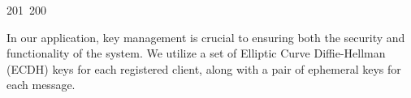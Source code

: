 201~200~\documentclass{article}
\begin{document}
\begin{figure}[ht]
	                                                                                                                                                                                                                                                                                                	                                                                                                                                        	    	                                                                                                	                                                                                                                                                                                                                                                \label{fig:enter-label}
	                                                                                                                                                                                                                                                                                                	                                                                                                                                        	    	                                                                                                	                                                                                                                                                                                                                                                \end{figure}

	                                                                                                                                                                                                                                                                                                	                                                                                                                                        	    	                                                                                                	                                                                                                                                                                                                                                                In our application, key management is crucial to ensuring both the security and functionality of the system. We utilize a set of Elliptic Curve Diffie-Hellman (ECDH) keys for each registered client, along with a pair of ephemeral keys for each message.
\end{document}
